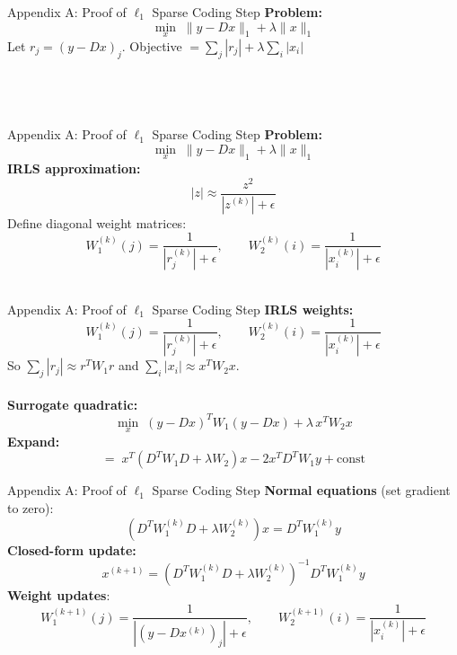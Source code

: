 \documentclass{beamer}
\begin{document}
\begin{frame}
\vfill
{}\vfill
\end{frame}


\appendix

\begin{frame}
\vfill
{}\vfill
\end{frame}


\begin{frame}{Appendix A: Proof of $\ell_1$ Sparse Coding Step}
\textbf{Problem:}
\[
\min_x \;\|y - Dx\|_1 + \lambda\|x\|_1
\]
Let $r_j = (y-Dx)_j$. Objective $=\displaystyle\sum_j|r_j|+\lambda\sum_i|x_i|$
\[
\phantom{|z|\approx\frac{z^2}{|z^{(k)}|+\epsilon}}
\]
\phantom{IRLS approximation: replace each $|\cdot|$ by a weighted square.}\\[0.3em]
\end{frame}

\begin{frame}{Appendix A: Proof of $\ell_1$ Sparse Coding Step}
\textbf{Problem:}
\[
\min_x \;\|y - Dx\|_1 + \lambda\|x\|_1
\]
\textbf{IRLS approximation:}
\[
|z|\approx\frac{z^2}{|z^{(k)}|+\epsilon}
\]
Define diagonal weight matrices:
\[
W_1^{(k)}(j)=\frac{1}{|r_j^{(k)}|+\epsilon},\qquad W_2^{(k)}(i)=\frac{1}{|x_i^{(k)}|+\epsilon}
\]
\\[0.3em]
\end{frame}

\begin{frame}{Appendix A: Proof of $\ell_1$ Sparse Coding Step}
\textbf{IRLS weights:}
\[
W_1^{(k)}(j)=\frac{1}{|r_j^{(k)}|+\epsilon},\qquad W_2^{(k)}(i)=\frac{1}{|x_i^{(k)}|+\epsilon}
\]
So $\sum_j|r_j|\approx r^TW_1r$ and $\sum_i|x_i|\approx x^TW_2x$. \\
\phantom{123}\\
\textbf{Surrogate quadratic:}
\[
\min_x\;(y-Dx)^TW_1(y-Dx)+\lambda\,x^TW_2x
\]
\textbf{Expand:}
\[
=\;x^T\!\left(D^TW_1D+\lambda W_2\right)x - 2x^TD^TW_1y + \text{const}
\]
\phantom{Set gradient to zero $\Rightarrow$ normal equations.}
\end{frame}

\begin{frame}{Appendix A: Proof of $\ell_1$ Sparse Coding Step}
\textbf{Normal equations} (set gradient to zero):
\[
\left(D^TW_1^{(k)}D+\lambda W_2^{(k)}\right)x = D^TW_1^{(k)}y
\]
\textbf{Closed-form update:}
\[
\boxed{x^{(k+1)}=\left(D^TW_1^{(k)}D+\lambda W_2^{(k)}\right)^{-1}D^TW_1^{(k)}y}
\]
\textbf{Weight updates}:
\[
W_1^{(k+1)}(j)=\frac{1}{\left|(y-Dx^{(k)})_j\right|+\epsilon},\qquad
W_2^{(k+1)}(i)=\frac{1}{\left|x_i^{(k)}\right|+\epsilon}
\]
\end{frame}
\end{document}
